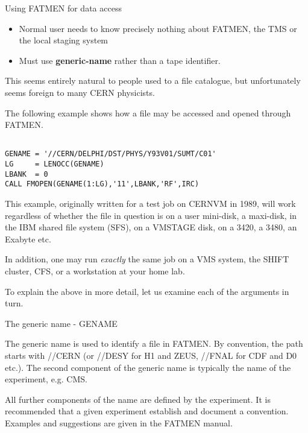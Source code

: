 \begin{slide}

\begin{center}Using FATMEN for data access\end{center}

\begin{itemize}
\item
Normal user needs to know precisely nothing
about FATMEN, the TMS or the local staging system
\item
Must use {\bf generic-name} 
rather than a tape identifier. 
\end{itemize}

This seems entirely natural
to people used to a file catalogue, but unfortunately
seems foreign to many CERN physicists.

The following example shows how a file may be accessed and
opened through FATMEN.
\end{slide}

\begin{slide}

\begin{small}
\begin{verbatim}

GENAME = '//CERN/DELPHI/DST/PHYS/Y93V01/SUMT/C01'
LG     = LENOCC(GENAME)
LBANK  = 0
CALL FMOPEN(GENAME(1:LG),'11',LBANK,'RF',IRC)

\end{verbatim}
\end{small}

\end{slide}

\begin{slide}
This example, originally written for a test job on CERNVM in 1989,
will work regardless of whether the file in question is on a user
mini-disk, a maxi-disk, in the IBM shared file system (SFS),
on a VMSTAGE disk, on a 3420, a 3480, an Exabyte etc.

In addition, one may run {\it exactly} the same job on a VMS system,
the SHIFT cluster, CFS, or a workstation at your home lab.

To explain the above in more detail, let us examine each of the arguments
in turn.
\end{slide}

\begin{slide}
\begin{center}The generic name - GENAME\end{center}

The generic name is used to identify a file in FATMEN. By convention,
the path starts with //CERN (or //DESY for H1 and ZEUS, //FNAL for CDF and D0 etc.).
The second component of the generic name is typically the name of the experiment,
e.g. CMS.

All further components of the name are defined by the experiment.
It is recommended that a given experiment establish and document
a convention. Examples and suggestions are given in the FATMEN manual.
\end{slide}


